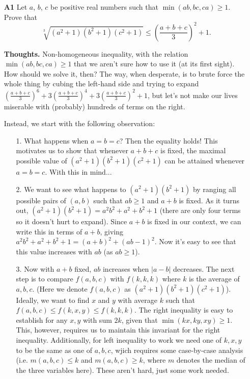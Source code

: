 \documentclass[11pt,a4paper]{article}
\begin{document}
\begin{itemize}
\item[\textbf{A1}]
Let $a$, $b$, $c$ be positive real numbers such that $\min(ab,bc,ca) \ge 1$. Prove that $$\sqrt[3]{(a^2+1)(b^2+1)(c^2+1)} \le \left(\frac{a+b+c}{3}\right)^2 + 1.$$

\textbf{Thoughts.} 
Non-homogeneous inequality, with the relation $\min(ab,bc,ca) \ge 1$ that we aren't sure how to use it (at its first sight). 
How should we solve it, then? 
The way, when desperate, is to brute force the whole thing by cubing the left-hand side and trying to expand 
$\left(\frac{a+b+c}{3}\right)^6+3\left(\frac{a+b+c}{3}\right)^4+3\left(\frac{a+b+c}{3}\right)^2+1$, 
but let's not make our lives miserable with (probably) hundreds of terms on the right. 

Instead, we start with the following observation: 
\begin{itemize}
\item [1.] What happens when $a=b=c$? Then the equality holds! 
This motivates us to show that whenever $a+b+c$ is fixed, the maximal possible value of $(a^2+1)(b^2+1)(c^2+1)$ can be attained whenever $a=b=c$. With this in mind...
\item [2.] We want to see what happens to $(a^2+1)(b^2+1)$ by ranging all possible pairs of $(a,b)$ such that $ab\ge 1$ and $a+b$ is fixed. 
As it turns out, $(a^2+1)(b^2+1)=a^2b^2+a^2+b^2+1$ (there are only four terms so it doesn't hurt to expand). 
Since $a+b$ is fixed in our context, we can write this in terms of $a+b$, giving 
$a^2b^2+a^2+b^2+1=(a+b)^2+(ab-1)^2$. 
Now it's easy to see that this value increases with $ab$ (as $ab\ge 1$). 
\item [3.] Now with $a+b$ fixed, $ab$ increases when $|a-b|$ decreases. 
The next step is to compare $f(a,b,c)$ with $f(k,k,k)$ where $k$ is the average of $a,b,c$. 
(Here we denote $f(a,b,c)$ as $(a^2+1)(b^2+1)(c^2+1)$). 
Ideally, we want to find $x$ and $y$ with average $k$ such that 
$f(a,b,c)\le f(k,x,y)\le f(k,k,k)$. 
The right inequality is easy to establish for any $x, y$ with sum $2k$, given that $\min(kx, ky, xy)\ge 1$. 
This, however, requires us to maintain this invariant for the right inequality. 
Additionally, for left inequality to work we need one of $k, x, y$ to be the same as one of $a, b, c$, 
wjich requires some case-by-case analysis (i.e. $m(a,b,c)\le k$ and $m(a,b,c)\ge k$, where $m$ denotes the median of the three variables here). 
These aren't hard, just some work needed. 
\end{itemize}


\end{itemize}
\end{document}
